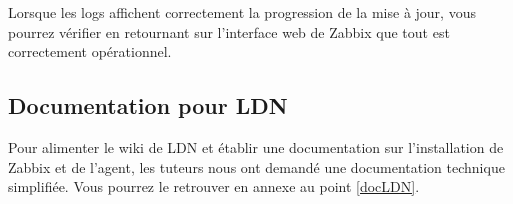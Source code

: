 			Lorsque les logs affichent correctement la progression de la mise à jour, vous pourrez vérifier en retournant sur l'interface web de Zabbix que tout est correctement opérationnel.\\

	\subsection{Documentation pour LDN}
		\vspace{0.3cm}
		Pour alimenter le wiki de LDN et établir une documentation sur l'installation de Zabbix et de l'agent, les tuteurs nous ont demandé une documentation technique simplifiée. Vous pourrez le retrouver en annexe au point \ref{docLDN}.\\

\newpage
